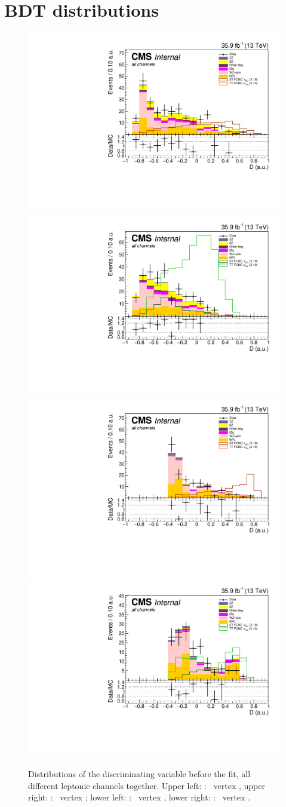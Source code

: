 \section{BDT distributions}
\label{app:BDT}
\begin{figure}[htbp]
	\centering
	\includegraphics[width=0.49\linewidth]{6_Search/Figures/BDTdistributions/toppair_Zut_BDT_all_Stack}
	\includegraphics[width=0.49\linewidth]{6_Search/Figures/BDTdistributions/toppair_Zct_BDT_all_Stack}
	\includegraphics[width=0.49\linewidth]{6_Search/Figures/BDTdistributions/singletop_Zut_BDT_all_Stack}
	\includegraphics[width=0.49\linewidth]{6_Search/Figures/BDTdistributions/singletop_Zct_BDT_all_Stack}
	\caption{Distributions of the discriminating variable before the fit, all different leptonic channels together. Upper left: \TTSR: \Zut\ vertex , upper right: \TTSR: \Zct\ vertex ; lower left: \STSR: \Zut\ vertex , lower right: \STSR: \Zct\ vertex .}
	\label{fig:bdtallstack}
\end{figure}	

